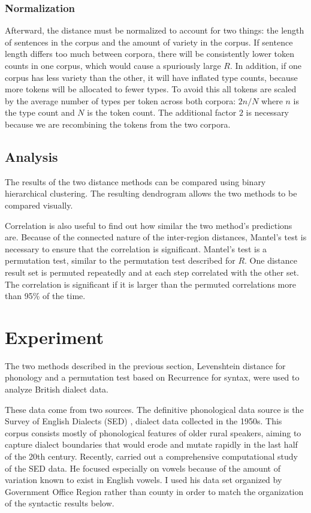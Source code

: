 \documentclass[11pt]{article}
\begin{document}
\subsubsection{Normalization}
Afterward, the distance must be normalized to account for two things:
the length of sentences in the corpus and the amount of variety in the
corpus. If sentence length differs too much between corpora, there
will be consistently lower token counts in one corpus, which would
cause a spuriously large $R$. In addition, if one corpus has less
variety than the other, it will have inflated type counts, because
more tokens will be allocated to fewer types. To avoid
this all tokens are scaled by the average number of types per token
across both corpora: $2n/N$ where $n$ is the type count and $N$ is
the token count. The additional factor $2$ is necessary because we are
recombining the tokens from the two corpora.

\subsection{Analysis}

The results of the two distance methods can be compared using
binary hierarchical clustering. The resulting dendrogram allows the two
methods to be compared visually.

Correlation is also useful to find out how similar the two method's
predictions are. Because of the connected nature of the inter-region
distances, Mantel's test is necessary to ensure that the correlation
is significant. Mantel's test is a permutation test, similar to the
permutation test described for $R$. One distance result set is
permuted repeatedly and at each step correlated with the other
set. The correlation is significant if it is larger than the permuted
correlations more than 95\% of the time.

\section{Experiment}
The two methods described in the previous section, Levenshtein
distance for phonology and a permutation test based on {\sc
  Recurrence} for syntax, were used to analyze British dialect data.

These data come from two sources. The definitive phonological data
source is the Survey of English Dialects (SED) \cite{orton63}, dialect
data collected in the 1950s. This corpus consists mostly of
phonological features of older rural speakers, aiming to capture
dialect boundaries that would erode and mutate rapidly in the last
half of the 20th century. Recently,  carried
out a comprehensive computational study of the SED data. He focused
especially on vowels because of the amount of variation known to exist
in English vowels. I used his
data set organized by Government Office Region rather than county in
order to match the organization of the syntactic results below.
\end{document}
